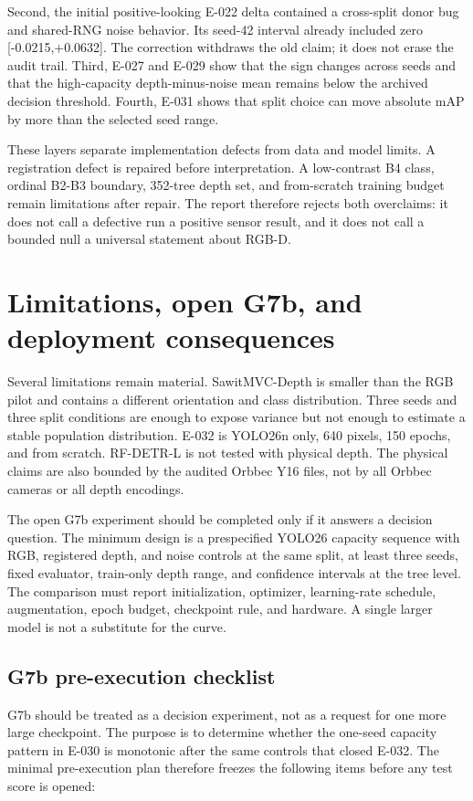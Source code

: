 \documentclass[preprint,12pt]{elsarticle}
\begin{document}
Second, the initial positive-looking E-022 delta contained a cross-split donor
bug and shared-RNG noise behavior. Its seed-42 interval already included zero
[-0.0215,+0.0632]. The correction withdraws the old claim; it does not erase
the audit trail. Third, E-027 and E-029 show that the sign changes across
seeds and that the high-capacity depth-minus-noise mean remains below the
archived decision threshold. Fourth, E-031 shows that split choice can move
absolute mAP by more than the selected seed range.

These layers separate implementation defects from data and model limits. A
registration defect is repaired before interpretation. A low-contrast B4
class, ordinal B2-B3 boundary, 352-tree depth set, and from-scratch training
budget remain limitations after repair. The report therefore rejects both
overclaims: it does not call a defective run a positive sensor result, and it
does not call a bounded null a universal statement about RGB-D.

\section{Limitations, open G7b, and deployment consequences}
\label{sec:final-limitations}
Several limitations remain material. SawitMVC-Depth is smaller than the RGB
pilot and contains a different orientation and class distribution. Three seeds
and three split conditions are enough to expose variance but not enough to
estimate a stable population distribution. E-032 is YOLO26n only, 640 pixels,
150 epochs, and from scratch. RF-DETR-L is not tested with physical depth.
The physical claims are also bounded by the audited Orbbec Y16 files, not by
all Orbbec cameras or all depth encodings.

The open G7b experiment should be completed only if it answers a decision
question. The minimum design is a prespecified YOLO26 capacity sequence with
RGB, registered depth, and noise controls at the same split, at least three
seeds, fixed evaluator, train-only depth range, and confidence intervals at
the tree level. The comparison must report initialization, optimizer,
learning-rate schedule, augmentation, epoch budget, checkpoint rule, and
hardware. A single larger model is not a substitute for the curve.

\subsection{G7b pre-execution checklist}
G7b should be treated as a decision experiment, not as a request for one more
large checkpoint. The purpose is to determine whether the one-seed capacity
pattern in E-030 is monotonic after the same controls that closed E-032. The
minimal pre-execution plan therefore freezes the following items before any test
score is opened:
\end{document}
